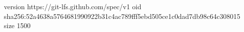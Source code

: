 version https://git-lfs.github.com/spec/v1
oid sha256:52a4638a5764681990922b31c4ac789fff5ebd505ce1c0dad7db98c64c308015
size 1500

